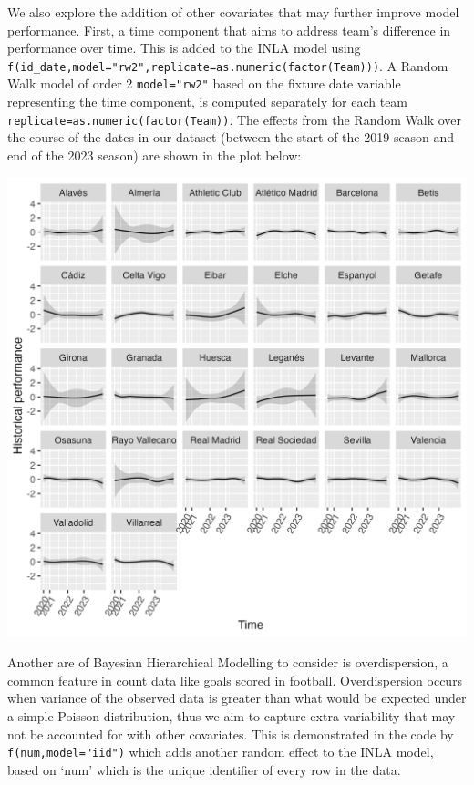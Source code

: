 \documentclass[
]{article}
\begin{document}
We also explore the addition of other covariates that may further
improve model performance. First, a time component that aims to address
team's difference in performance over time. This is added to the INLA
model using
\texttt{f(id\_date,model="rw2",replicate=as.numeric(factor(Team)))}. A
Random Walk model of order 2 \texttt{model="rw2"} based on the fixture
date variable representing the time component, is computed separately
for each team \texttt{replicate=as.numeric(factor(Team))}. The effects
from the Random Walk over the course of the dates in our dataset
(between the start of the 2019 season and end of the 2023 season) are
shown in the plot below:

\includegraphics[width=25in]{LaligaTTplot}

Another are of Bayesian Hierarchical Modelling to consider is
overdispersion, a common feature in count data like goals scored in
football. Overdispersion occurs when variance of the observed data is
greater than what would be expected under a simple Poisson distribution,
thus we aim to capture extra variability that may not be accounted for
with other covariates. This is demonstrated in the code by
\texttt{f(num,model="iid")} which adds another random effect to the INLA
model, based on `num' which is the unique identifier of every row in the
data.
\end{document}
